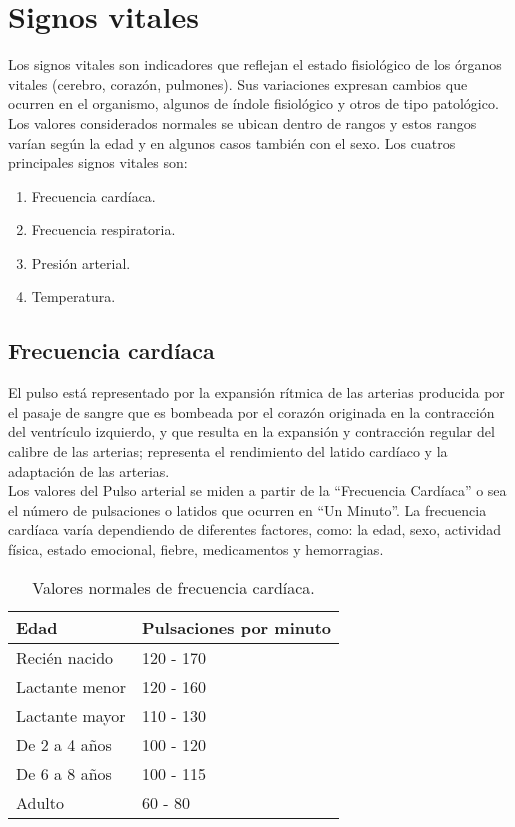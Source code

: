 \section{Signos vitales}
	Los signos vitales son indicadores que reflejan el estado fisiológico de los órganos vitales (cerebro, corazón, pulmones). Sus variaciones expresan cambios que ocurren en el organismo, algunos de índole fisiológico y otros de tipo patológico. Los valores considerados normales se ubican dentro de rangos y estos rangos varían según la edad y en algunos casos también con el sexo. \cite{aguayoChile} \cite{cobo2011} Los cuatros principales signos vitales son: 
	\begin{enumerate}
		\item Frecuencia cardíaca.
		\item Frecuencia respiratoria.
		\item Presión arterial.
		\item Temperatura.
	\end{enumerate}
	
	\subsection{Frecuencia cardíaca}
	El pulso está representado por la expansión rítmica de las arterias producida por el pasaje de sangre que es bombeada por el corazón originada en la contracción del ventrículo izquierdo, y que resulta en la expansión y contracción regular del calibre de las arterias; representa el rendimiento del latido cardíaco y la adaptación de las arterias. \cite{signos2017} \cite{aguayoChile} \cite{valoresUNAM}\\
	
	Los valores del Pulso arterial se miden a partir de la “Frecuencia Cardíaca” o sea el número de pulsaciones o latidos que ocurren en “Un Minuto”. La frecuencia cardíaca varía dependiendo de diferentes factores, como: la edad, sexo, actividad física, estado emocional, fiebre, medicamentos y hemorragias.
	
	\begin{table}[htbp]
		\begin{center}
			\begin{tabular}{|l|l|}
				\hline
				\textbf{Edad} & \textbf{Pulsaciones por minuto} \\
				\hline \hline
				Recién nacido & 120 - 170  \\
				\hline
				Lactante menor & 120 - 160  \\
				\hline
				Lactante mayor & 110 - 130  \\
				\hline
				De 2 a 4 años & 100 - 120  \\
				\hline
				De 6 a 8 años & 100 - 115  \\
				\hline
				Adulto & 60 - 80  \\
				\hline
			\end{tabular}
			\caption{Valores normales de frecuencia cardíaca.}
		\end{center}
	\end{table}
	
